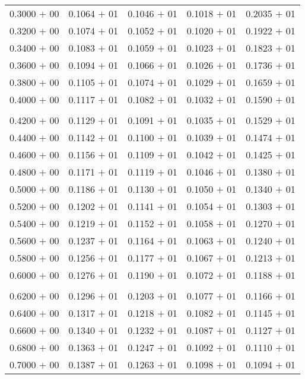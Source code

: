 \documentclass[a4paper,11pt]{article}
\begin{document}
\begin{center}
\begin{longtable}{ c c c c c }
0.3000 $+$ 00 & 0.1064 $+$ 01 & 0.1046 $+$ 01 & 0.1018 $+$ 01 & 0.2035 $+$ 01 \\
0.3200 $+$ 00 & 0.1074 $+$ 01 & 0.1052 $+$ 01 & 0.1020 $+$ 01 & 0.1922 $+$ 01 \\
0.3400 $+$ 00 & 0.1083 $+$ 01 & 0.1059 $+$ 01 & 0.1023 $+$ 01 & 0.1823 $+$ 01 \\
0.3600 $+$ 00 & 0.1094 $+$ 01 & 0.1066 $+$ 01 & 0.1026 $+$ 01 & 0.1736 $+$ 01 \\
0.3800 $+$ 00 & 0.1105 $+$ 01 & 0.1074 $+$ 01 & 0.1029 $+$ 01 & 0.1659 $+$ 01 \\
0.4000 $+$ 00 & 0.1117 $+$ 01 & 0.1082 $+$ 01 & 0.1032 $+$ 01 & 0.1590 $+$ 01 \\
\\
0.4200 $+$ 00 & 0.1129 $+$ 01 & 0.1091 $+$ 01 & 0.1035 $+$ 01 & 0.1529 $+$ 01 \\
0.4400 $+$ 00 & 0.1142 $+$ 01 & 0.1100 $+$ 01 & 0.1039 $+$ 01 & 0.1474 $+$ 01 \\
0.4600 $+$ 00 & 0.1156 $+$ 01 & 0.1109 $+$ 01 & 0.1042 $+$ 01 & 0.1425 $+$ 01 \\
0.4800 $+$ 00 & 0.1171 $+$ 01 & 0.1119 $+$ 01 & 0.1046 $+$ 01 & 0.1380 $+$ 01 \\
0.5000 $+$ 00 & 0.1186 $+$ 01 & 0.1130 $+$ 01 & 0.1050 $+$ 01 & 0.1340 $+$ 01 \\
0.5200 $+$ 00 & 0.1202 $+$ 01 & 0.1141 $+$ 01 & 0.1054 $+$ 01 & 0.1303 $+$ 01 \\
0.5400 $+$ 00 & 0.1219 $+$ 01 & 0.1152 $+$ 01 & 0.1058 $+$ 01 & 0.1270 $+$ 01 \\
0.5600 $+$ 00 & 0.1237 $+$ 01 & 0.1164 $+$ 01 & 0.1063 $+$ 01 & 0.1240 $+$ 01 \\
0.5800 $+$ 00 & 0.1256 $+$ 01 & 0.1177 $+$ 01 & 0.1067 $+$ 01 & 0.1213 $+$ 01 \\
0.6000 $+$ 00 & 0.1276 $+$ 01 & 0.1190 $+$ 01 & 0.1072 $+$ 01 & 0.1188 $+$ 01 \\
\\
0.6200 $+$ 00 & 0.1296 $+$ 01 & 0.1203 $+$ 01 & 0.1077 $+$ 01 & 0.1166 $+$ 01 \\
0.6400 $+$ 00 & 0.1317 $+$ 01 & 0.1218 $+$ 01 & 0.1082 $+$ 01 & 0.1145 $+$ 01 \\
0.6600 $+$ 00 & 0.1340 $+$ 01 & 0.1232 $+$ 01 & 0.1087 $+$ 01 & 0.1127 $+$ 01 \\
0.6800 $+$ 00 & 0.1363 $+$ 01 & 0.1247 $+$ 01 & 0.1092 $+$ 01 & 0.1110 $+$ 01 \\
0.7000 $+$ 00 & 0.1387 $+$ 01 & 0.1263 $+$ 01 & 0.1098 $+$ 01 & 0.1094 $+$ 01 \\

\end{longtable}
\end{center}
\end{document}
